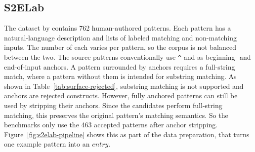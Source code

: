 %
%
%

\subsection{S2ELab}
\label{sec:eval-s2elab}

The dataset by \citet{s2elab-regexeval-dataset} 
contains 762 human-authored patterns. 
Each pattern has a natural-language description 
and lists of labeled matching and non-matching inputs. 
The number of each varies per pattern, 
so the corpus is not balanced between the two.
The source patterns conventionally use \texttt{\textasciicircum} 
and \texttt{\textdollar} as beginning- and end-of-input anchors. 
A pattern surrounded by anchors requires a full-string match, 
where a pattern without them is intended for substring matching. 
As shown in Table~\ref{tab:surface-rejected},
substring matching is not supported and anchors are rejected constructs.
However, fully anchored patterns can still be used
by stripping their anchors.
Since the candidates perform full-string matching,
this preserves the original pattern's matching semantics.
So the benchmarks only use the 463 accepted patterns after anchor stripping.
Figure~\ref{fig:s2elab-pipeline} shows this 
as part of the data preparation, that turns one example pattern into an $entry$.

